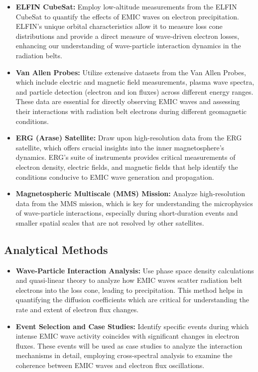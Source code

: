 \documentclass[
  letterpaper,
  DIV=11,
  numbers=noendperiod]{scrartcl}
\begin{document}
\begin{itemize}
\item
  \textbf{ELFIN CubeSat:} Employ low-altitude measurements from the ELFIN CubeSat to quantify the effects of EMIC waves on electron precipitation. ELFIN's unique orbital characteristics allow it to measure loss cone distributions and provide a direct measure of wave-driven electron losses, enhancing our understanding of wave-particle interaction dynamics in the radiation belts.
\item
  \textbf{Van Allen Probes:} Utilize extensive datasets from the Van Allen Probes, which include electric and magnetic field measurements, plasma wave spectra, and particle detection (electron and ion fluxes) across different energy ranges. These data are essential for directly observing EMIC waves and assessing their interactions with radiation belt electrons during different geomagnetic conditions.
\item
  \textbf{ERG (Arase) Satellite:} Draw upon high-resolution data from the ERG satellite, which offers crucial insights into the inner magnetosphere's dynamics. ERG's suite of instruments provides critical measurements of electron density, electric fields, and magnetic fields that help identify the conditions conducive to EMIC wave generation and propagation.
\item
  \textbf{Magnetospheric Multiscale (MMS) Mission:} Analyze high-resolution data from the MMS mission, which is key for understanding the microphysics of wave-particle interactions, especially during short-duration events and smaller spatial scales that are not resolved by other satellites.
\end{itemize}

\subsection{Analytical Methods}\label{analytical-methods}

\begin{itemize}
\item
  \textbf{Wave-Particle Interaction Analysis:} Use phase space density calculations and quasi-linear theory to analyze how EMIC waves scatter radiation belt electrons into the loss cone, leading to precipitation. This method helps in quantifying the diffusion coefficients which are critical for understanding the rate and extent of electron flux changes.
\item
  \textbf{Event Selection and Case Studies:} Identify specific events during which intense EMIC wave activity coincides with significant changes in electron fluxes. These events will be used as case studies to analyze the interaction mechanisms in detail, employing cross-spectral analysis to examine the coherence between EMIC waves and electron flux oscillations.
\end{itemize}
\end{document}
